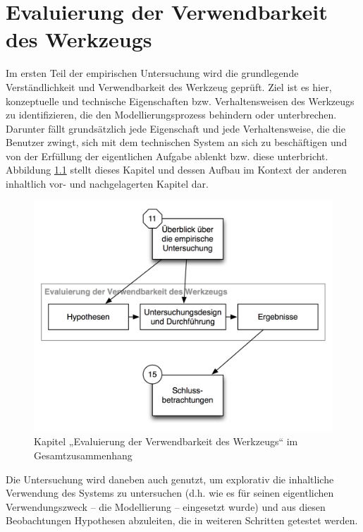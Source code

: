 \chapter{Evaluierung der Verwendbarkeit des Werkzeugs} %
\label{cha:eval_werkzeug}

Im ersten Teil der empirischen Untersuchung wird die grundlegende Verständlichkeit und Verwendbarkeit des Werkzeug geprüft. Ziel ist es hier, konzeptuelle und technische Eigenschaften bzw. Verhaltensweisen des Werkzeugs zu identifizieren, die den Modellierungsprozess behindern oder unterbrechen. Darunter fällt grundsätzlich jede Eigenschaft und jede Verhaltensweise, die die Benutzer zwingt, sich mit dem technischen System an sich zu beschäftigen und von der Erfüllung der eigentlichen Aufgabe ablenkt bzw. diese unterbricht. Abbildung \ref{fig:img_Kontextgrafiken_k12} stellt dieses Kapitel und dessen Aufbau im Kontext der anderen inhaltlich vor- und nachgelagerten Kapitel dar.

\begin{figure}[htbp]
	\centering
		\includegraphics[scale=0.6]{img/Kontextgrafiken/k12.png}
	\caption{Kapitel „Evaluierung der Verwendbarkeit des Werkzeugs“ im Gesamtzusammenhang}
	\label{fig:img_Kontextgrafiken_k12}
\end{figure}

Die Untersuchung wird daneben auch genutzt, um explorativ die inhaltliche Verwendung des Systems zu untersuchen (d.h. wie es für seinen eigentlichen Verwendungszweck -- die Modellierung -- eingesetzt wurde) und aus diesen Beobachtungen Hypothesen abzuleiten, die in weiteren Schritten getestet werden.

